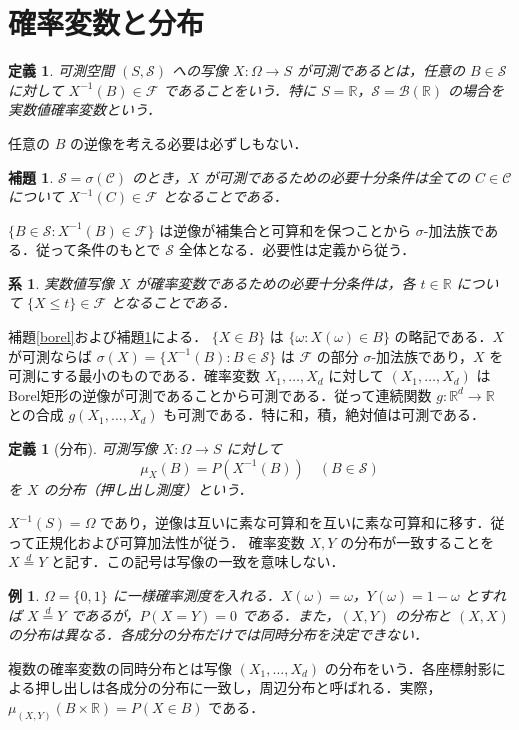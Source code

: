 \documentclass[a5paper,10pt,onecolumn]{jsarticle}
\makeatletter
\theoremstyle{mathnotetheorem}
\newtheorem{definition}[theorem]{定義}
\newtheorem{lemma}[theorem]{補題}
\newtheorem{corollary}[theorem]{系}
\newtheorem{example}[theorem]{例}
\renewcommand{\proofname}{証明}
\renewenvironment{proof}[1][\proofname]{%
  \par\pushQED{\qed}\normalfont\topsep4\p@\@plus2\p@\relax
  \trivlist\item[\hskip\labelsep\bfseries #1]\ignorespaces
}{\popQED\endtrivlist\@endpefalse}
\newcommand{\R}{\mathbb{R}}
\newcommand{\F}{\mathcal F}
\newcommand{\B}{\mathcal B}
\newcommand{\1}{\mathbf{1}}
\makeatother
\begin{document}
\section{確率変数と分布}
\begin{definition}
可測空間 $(S,\mathcal S)$ への写像 $X:\Omega\to S$ が可測であるとは，任意の $B\in\mathcal S$ に対して $X^{-1}(B)\in\F$ であることをいう．特に $S=\R$，$\mathcal S=\B(\R)$ の場合を実数値確率変数という．
\end{definition}
任意の $B$ の逆像を考える必要は必ずしもない．
\begin{lemma}\label{meas}
$\mathcal S=\sigma(\mathcal C)$ のとき，$X$ が可測であるための必要十分条件は全ての $C\in\mathcal C$ について $X^{-1}(C)\in\F$ となることである．
\end{lemma}
\begin{proof}
$\{B\in\mathcal S:X^{-1}(B)\in\F\}$ は逆像が補集合と可算和を保つことから $\sigma$-加法族である．従って条件のもとで $\mathcal S$ 全体となる．必要性は定義から従う．
\end{proof}
\begin{corollary}
実数値写像 $X$ が確率変数であるための必要十分条件は，各 $t\in\R$ について $\{X\le t\}\in\F$ となることである．
\end{corollary}
\begin{proof}
補題\ref{borel}および補題\ref{meas}による．
\end{proof}
$\{X\in B\}$ は $\{\omega:X(\omega)\in B\}$ の略記である．$X$ が可測ならば $\sigma(X)=\{X^{-1}(B):B\in\mathcal S\}$ は $\F$ の部分 $\sigma$-加法族であり，$X$ を可測にする最小のものである．確率変数 $X_1,\ldots,X_d$ に対して $(X_1,\ldots,X_d)$ はBorel矩形の逆像が可測であることから可測である．従って連続関数 $g:\R^d\to\R$ との合成 $g(X_1,\ldots,X_d)$ も可測である．特に和，積，絶対値は可測である．
\begin{definition}[分布]
可測写像 $X:\Omega\to S$ に対して
\[
 \mu_X(B)=P(X^{-1}(B))\quad(B\in\mathcal S)
\]
を $X$ の分布（押し出し測度）という．
\end{definition}
\begin{proof}[確率測度であることの証明]
$X^{-1}(S)=\Omega$ であり，逆像は互いに素な可算和を互いに素な可算和に移す．従って正規化および可算加法性が従う．
\end{proof}
確率変数 $X,Y$ の分布が一致することを $X\overset{d}=Y$ と記す．この記号は写像の一致を意味しない．
\begin{example}
$\Omega=\{0,1\}$ に一様確率測度を入れる．$X(\omega)=\omega$，$Y(\omega)=1-\omega$ とすれば $X\overset{d}=Y$ であるが，$P(X=Y)=0$ である．また，$(X,Y)$ の分布と $(X,X)$ の分布は異なる．各成分の分布だけでは同時分布を決定できない．
\end{example}
複数の確率変数の同時分布とは写像 $(X_1,\ldots,X_d)$ の分布をいう．各座標射影による押し出しは各成分の分布に一致し，周辺分布と呼ばれる．実際，$\mu_{(X,Y)}(B\times\R)=P(X\in B)$ である．
\end{document}

